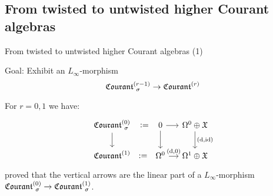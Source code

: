 \documentclass[beamer,10pt]{standalone}
\begin{document}
\subsection{From twisted to untwisted higher Courant algebras}

\begin{frame}{From twisted to untwisted higher Courant algebras (1)}
	\begin{block}{Goal:}
		Exhibit an $L_\infty$-morphism
		$$ \Courant[\sigma]{r-1} \to \Courant{r}$$
	\end{block}
	\vfill \pause	

	\begin{exblock}
	For $r=0,1$ we have:
	\begin{displaymath}
		\begin{tikzcd}[ampersand replacement=\&,column sep = small]
			\Courant[\sigma]{0} \ar[r,phantom,":="] \ar[d]
			\&[1em]
			0 \ar[r] \ar[d]
			\& \Omega^0\oplus \X \ar[d,"{(\d,\id)}"]
			\\
			\Courant{1} \ar[r,phantom,":="] 
			\&
			\Omega^0 \ar[r,"{(\d,0)}"] 
			\& 
			\Omega^1\oplus \X
		\end{tikzcd}
	\end{displaymath}
	\cite{Zambon2012} proved that  the vertical arrows are the linear part of a $L_\infty$-morphism $\Courant[\sigma]{0} \to \Courant[\sigma]{1}$.
	\end{exblock}
	\vfill
	
\end{frame}
\note[itemize]
{
	\item 
}
\end{document}
